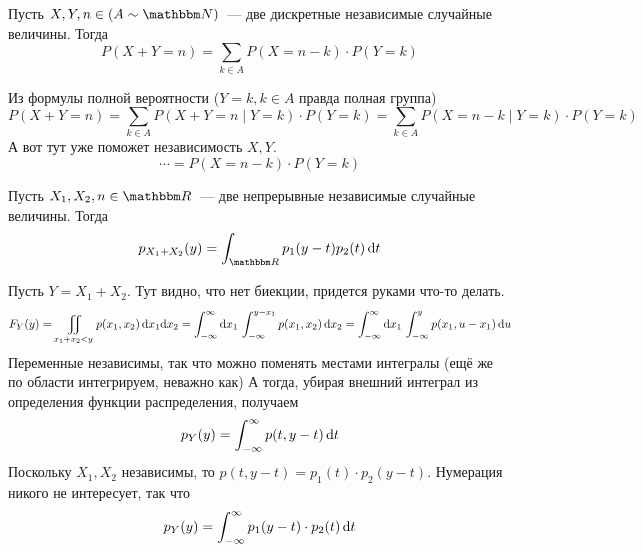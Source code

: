 \documentclass[12pt,timbord]{../../../notes}
\begin{document}
\begin{prop}\label{prop:stat::randsum::discsum}
  Пусть $X,Y,n\in(A\sim\N)$~--- две дискретные независимые случайные величины. Тогда 
  \[
    P(X+Y=n) = \sum_{k\in A} P(X=n-k)\cdot P(Y=k)
  \]
\end{prop}
\begin{itlproof}
  Из формулы полной вероятности ($Y=k, k\in A$ правда полная группа)
  \[
    P(X+Y =n) = \sum_{k\in A} P(X+Y =n \mid Y =k)\cdot P(Y = k) 
    = \sum_{k\in A} P(X= n-k\mid Y=k)\cdot P(Y=k)
  \]
  А вот тут уже поможет независимость $X,Y$.
  \[
    \cdots = P(X=n-k)\cdot P(Y=k)
  \]
\end{itlproof}

\begin{prop}\label{prop:stat::randsum::contsum}
  Пусть $X_1,X_2,n\in\R$~--- две непрерывные независимые случайные величины. Тогда 
  \[
    p_{X_1+X_2}(y) = \int_{\R} p_1(y-t) p_2(t) \,\del t
  \]
\end{prop}
\begin{itlproof}
  Пусть $Y = X_1 + X_2$. Тут видно, что нет биекции, придется руками что-то делать.
  \[
    F_Y(y) = \displaystyle\iint_{x_1+x_2 < y} p(x_1, x_2) \, \mathrm{d} x_1 \mathrm{d} x_2
    = \int_{-\infty}^\infty \mathrm{d} x_1\, \int_{-\infty}^{y-x_1} p(x_1, x_2) \, \mathrm{d} x_2 
    = \int_{-\infty}^\infty \mathrm{d} x_1 \, \int_{-\infty}^y p(x_1, u - x_1) \, \mathrm{d} u
  \]
  Переменные независимы, так что можно поменять местами интегралы (ещё же по области интегрируем,
  неважно как)
  А тогда, убирая внешний интеграл из определения функции распределения, получаем
  \[
    p_Y(y) = \int_{-\infty}^\infty p(t, y-t)\, \mathrm{d} t
  \]
  Поскольку $X_1, X_2$ независимы, то $p(t, y-t) = p_1(t)\cdot p_2(y-t)$. Нумерация никого не
  интересует, так что
  \[
    p_Y(y) =  \int_{-\infty}^\infty p_1(y-t)\cdot p_2(t)\, \mathrm{d} t
  \]
\end{itlproof}
\end{document}
